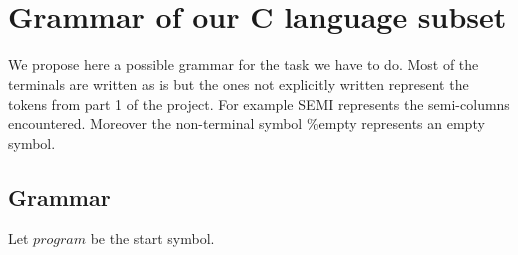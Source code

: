 \documentclass{article}
\begin{document}
\appendix
\section{\\Grammar of our C language subset}
\label{grammar}
We propose here a possible grammar for the task we have to do. Most of the terminals are written as is but the ones not explicitly written represent the tokens from part 1 of the project. For example {\sc SEMI} represents the semi-columns encountered. Moreover the non-terminal symbol {\%empty} represents an empty symbol. 
\subsection*{Grammar}

Let $program$ be the start symbol. 
\end{document}
